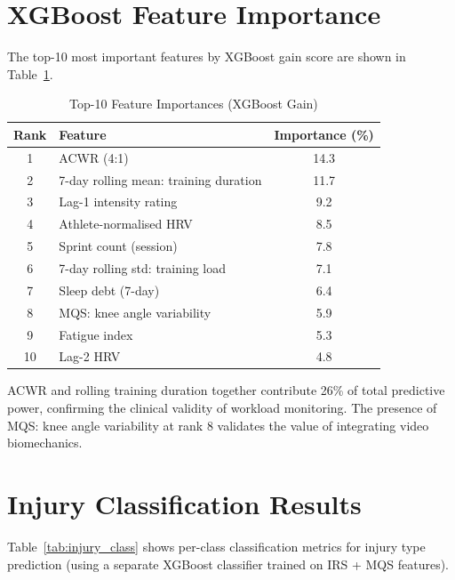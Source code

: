 \documentclass[12pt,a4paper]{report}
\begin{document}
\section{XGBoost Feature Importance}

The top-10 most important features by XGBoost gain score are shown in Table~\ref{tab:feat_imp}.

\begin{table}[h!]
  \centering
  \caption{Top-10 Feature Importances (XGBoost Gain)}
  \label{tab:feat_imp}
  \vspace*{5pt}
  \begin{tabular}{|c|l|c|}
    \hline
    \textbf{Rank} & \textbf{Feature} & \textbf{Importance (\%)} \\ \hline
    1 & ACWR (4:1)                        & 14.3 \\ \hline
    2 & 7-day rolling mean: training duration & 11.7 \\ \hline
    3 & Lag-1 intensity rating             & 9.2  \\ \hline
    4 & Athlete-normalised HRV             & 8.5  \\ \hline
    5 & Sprint count (session)             & 7.8  \\ \hline
    6 & 7-day rolling std: training load   & 7.1  \\ \hline
    7 & Sleep debt (7-day)                 & 6.4  \\ \hline
    8 & MQS: knee angle variability        & 5.9  \\ \hline
    9 & Fatigue index                      & 5.3  \\ \hline
    10 & Lag-2 HRV                         & 4.8  \\ \hline
  \end{tabular}
\end{table}

ACWR and rolling training duration together contribute 26\% of total predictive power, confirming the clinical validity of workload monitoring. The presence of MQS: knee angle variability at rank 8 validates the value of integrating video biomechanics.

\section{Injury Classification Results}

Table~\ref{tab:injury_class} shows per-class classification metrics for injury type prediction (using a separate XGBoost classifier trained on IRS + MQS features).
\end{document}
